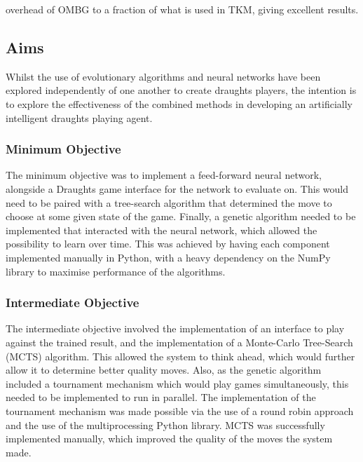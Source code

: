 \documentclass[12pt,a4paper]{article}
\begin{document}
overhead of OMBG to a fraction of what is used in TKM, giving excellent results.
    \subsection{Aims}

    Whilst the use of evolutionary algorithms and neural networks have been explored independently of one another to create draughts players, the intention is to explore the effectiveness of the combined methods in developing an artificially intelligent draughts playing agent. 

    \subsubsection{Minimum Objective}
        The minimum objective was to implement a feed-forward neural network, alongside a Draughts game interface for the network to evaluate on. This would need to be paired with a tree-search algorithm that determined the move to choose at some given state of the game. Finally, a genetic algorithm needed to be implemented that interacted with the neural network, which allowed the possibility to learn over time. This was achieved by having each component implemented manually in Python, with a heavy dependency on the NumPy library to maximise performance of the algorithms.

    \subsubsection{Intermediate Objective}
        The intermediate objective involved the implementation of an interface to play against the trained result, and the implementation of a Monte-Carlo Tree-Search (MCTS) algorithm. This allowed the system to think ahead, which would further allow it to determine better quality moves. Also, as the genetic algorithm included a tournament mechanism which would play games simultaneously, this needed to be implemented to run in parallel. The implementation of the tournament mechanism was made possible via the use of a round robin approach and the use of the multiprocessing Python library. MCTS was successfully implemented manually, which improved the quality of the moves the system made.
        
\end{document}
